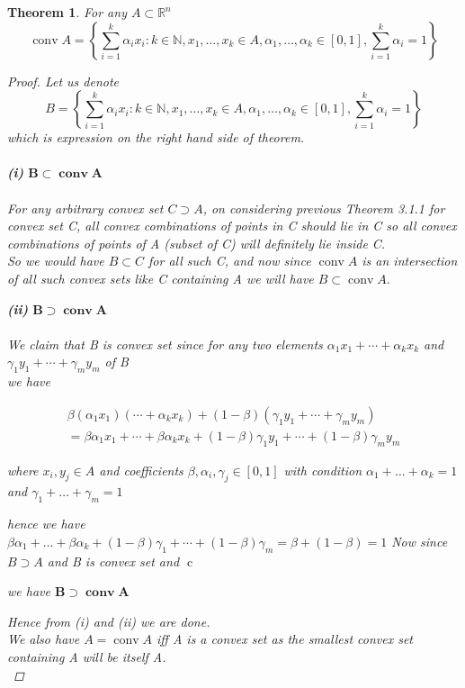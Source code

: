 \documentclass[oneside]{book}
\newtheorem{theorem}{Theorem}[section]
\begin{document}
 
\begin{theorem}
For  any $A \subset \mathbb{R}^n$
 $$ \operatorname{conv} A=\left\{\sum_{i=1}^{k} \alpha_{i} x_{i}: k \in \mathbb{N}, x_{1}, \ldots, x_{k} \in A, \alpha_{1}, \ldots, \alpha_{k} \in[0,1], \sum_{i=1}^{k} \alpha_{i}=1\right\} $$

 \begin{proof}
 Let us denote $$ B = \left\{\sum_{i=1}^{k} \alpha_{i} x_{i}: k \in \mathbb{N}, x_{1}, \ldots, x_{k} \in A, \alpha_{1}, \ldots, \alpha_{k} \in[0,1], \sum_{i=1}^{k} \alpha_{i}=1\right\} $$  which is expression on the right hand side of theorem.\\\\
 \textbf{(i)}  $ \mathbf{B} \subset \mathbf{\operatorname{conv} A}  $\\\\
     For any arbitrary convex set $C \supset A$, on considering previous Theorem 3.1.1 for convex set C, all convex combinations of points in C should lie in C so all convex combinations of points of A (subset of  C) will definitely lie inside C. \\ 
 So we would have $B\subset C $ for all such C, and now since  $\operatorname{conv} A $ is an intersection of all such convex sets like C containing A we will have  $ B \subset \operatorname{conv} A.  $  
 
 \textbf{(ii)}  $ \mathbf{B} \supset \mathbf{\operatorname{conv} A}  $\\\\
 We claim that B is convex set since for any two elements $\alpha_{1} x_{1}+\cdots+\alpha_{k} x_{k}$ and \\ $\gamma_{1} y_{1}+\cdots+\gamma_{m} y_{m}$  of B \\
 we have 
 
 
\begin{multline}
         \beta\left(\alpha_{1} x_{1}\right)  \left(\cdots+\alpha_{k} x_{k} \right) +(1-\beta)\left(\gamma_{1} y_{1}+\cdots+\gamma_{m} y_{m}\right) \\ = \beta \alpha_{1} x_{1}+\cdots+\beta \alpha_{k} x_{k}+(1-\beta) \gamma_{1} y_{1}+\cdots+(1-\beta) \gamma_{m} y_{m}  
\end{multline}
 
 where  $x_{i}, y_{j} \in A$ and coefficients $\beta, \alpha_{i}, \gamma_{j} \in[0,1]$ with  condition $\alpha_{1}+\ldots+\alpha_{k}=1$ and $\gamma_{1}+\ldots+\gamma_{m}=1$ 

hence we have \\
$
\beta \alpha_{1}+\ldots+\beta \alpha_{k}+(1-\beta) \gamma_{1}+\cdots+(1-\beta) \gamma_{m}=\beta+(1-\beta)=1
$
Now since $ B \supset A $ and B is convex set and $\operatorname{c}$
 
we have  $ \mathbf{B} \supset \mathbf{\operatorname{conv} A}  $ \par
 Hence from (i) and (ii) we are done. \\
 We also have $A = \operatorname{conv} A$ iff A is a convex set as the smallest convex set containing A will be itself A. \\

 \end{proof}
 
\end{theorem}
\end{document}
